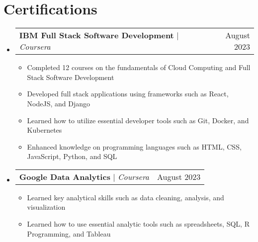 \documentclass[letterpaper,11pt]{article}
\makeatletter
\newcommand{\resumeItem}[1]{
  \item\small{
    {#1 \vspace{-2pt}}
  }
}
\newcommand{\resumeProjectHeading}[2]{
    \item
    \begin{tabular*}{0.97\textwidth}{l@{\extracolsep{\fill}}r}
      \small#1 & #2 \\
    \end{tabular*}\vspace{-7pt}
}
\newcommand{\resumeSubHeadingListStart}{\begin{itemize}[leftmargin=0.15in, label={}]}
\newcommand{\resumeSubHeadingListEnd}{\end{itemize}}
\newcommand{\resumeItemListStart}{\begin{itemize}}
\newcommand{\resumeItemListEnd}{\end{itemize}\vspace{-5pt}}
\makeatother
\begin{document}

\section{Certifications}
    \resumeSubHeadingListStart
      \resumeProjectHeading
          {\textbf{IBM Full Stack Software Development} $|$ \emph{Coursera}}{August 2023}
          \resumeItemListStart
            \resumeItem{Completed 12 courses on the fundamentals of Cloud Computing and Full Stack Software Development}
            \resumeItem{Developed full stack applications using frameworks such as React, NodeJS, and Django}
            \resumeItem{Learned how to utilize essential developer tools such as Git, Docker, and Kubernetes}
            \resumeItem{Enhanced knowledge on programming languages such as HTML, CSS, JavaScript, Python, and SQL}
          \resumeItemListEnd
      \resumeProjectHeading
          {\textbf{Google Data Analytics} $|$ \emph{Coursera}}{August 2023}
          \resumeItemListStart
            \resumeItem{Learned key analytical skills such as data cleaning, analysis, and visualization}
            \resumeItem{Learned how to use essential analytic tools such as spreadsheets, SQL, R Programming, and Tableau}
          \resumeItemListEnd
    \resumeSubHeadingListEnd







\end{document}
